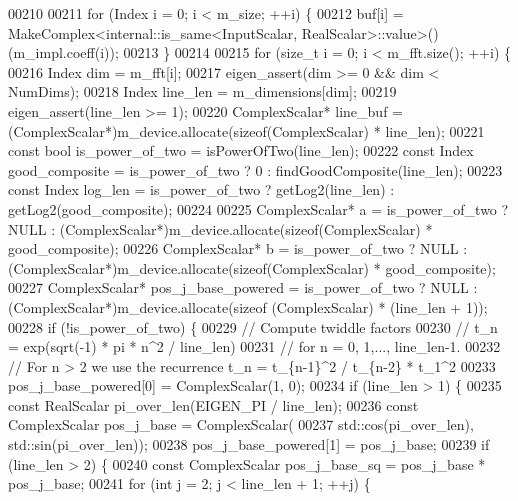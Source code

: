 \begin{DoxyCode}
00210 
00211     \textcolor{keywordflow}{for} (Index i = 0; i < m\_size; ++i) \{
00212       buf[i] = MakeComplex<internal::is\_same<InputScalar, RealScalar>::value>()(m\_impl.coeff(i));
00213     \}
00214 
00215     \textcolor{keywordflow}{for} (\textcolor{keywordtype}{size\_t} i = 0; i < m\_fft.size(); ++i) \{
00216       Index dim = m\_fft[i];
00217       eigen\_assert(dim >= 0 && dim < NumDims);
00218       Index line\_len = m\_dimensions[dim];
00219       eigen\_assert(line\_len >= 1);
00220       ComplexScalar* line\_buf = (ComplexScalar*)m\_device.allocate(\textcolor{keyword}{sizeof}(ComplexScalar) * line\_len);
00221       \textcolor{keyword}{const} \textcolor{keywordtype}{bool} is\_power\_of\_two = isPowerOfTwo(line\_len);
00222       \textcolor{keyword}{const} Index good\_composite = is\_power\_of\_two ? 0 : findGoodComposite(line\_len);
00223       \textcolor{keyword}{const} Index log\_len = is\_power\_of\_two ? getLog2(line\_len) : getLog2(good\_composite);
00224 
00225       ComplexScalar* a = is\_power\_of\_two ? NULL : (ComplexScalar*)m\_device.allocate(\textcolor{keyword}{sizeof}(ComplexScalar) *
       good\_composite);
00226       ComplexScalar* b = is\_power\_of\_two ? NULL : (ComplexScalar*)m\_device.allocate(\textcolor{keyword}{sizeof}(ComplexScalar) *
       good\_composite);
00227       ComplexScalar* pos\_j\_base\_powered = is\_power\_of\_two ? NULL : (ComplexScalar*)m\_device.allocate(\textcolor{keyword}{sizeof}
      (ComplexScalar) * (line\_len + 1));
00228       \textcolor{keywordflow}{if} (!is\_power\_of\_two) \{
00229         \textcolor{comment}{// Compute twiddle factors}
00230         \textcolor{comment}{//   t\_n = exp(sqrt(-1) * pi * n^2 / line\_len)}
00231         \textcolor{comment}{// for n = 0, 1,..., line\_len-1.}
00232         \textcolor{comment}{// For n > 2 we use the recurrence t\_n = t\_\{n-1\}^2 / t\_\{n-2\} * t\_1^2}
00233         pos\_j\_base\_powered[0] = ComplexScalar(1, 0);
00234         \textcolor{keywordflow}{if} (line\_len > 1) \{
00235           \textcolor{keyword}{const} RealScalar pi\_over\_len(EIGEN\_PI / line\_len);
00236           \textcolor{keyword}{const} ComplexScalar pos\_j\_base = ComplexScalar(
00237            std::cos(pi\_over\_len), std::sin(pi\_over\_len));
00238           pos\_j\_base\_powered[1] = pos\_j\_base;
00239           \textcolor{keywordflow}{if} (line\_len > 2) \{
00240             \textcolor{keyword}{const} ComplexScalar pos\_j\_base\_sq = pos\_j\_base * pos\_j\_base;
00241             \textcolor{keywordflow}{for} (\textcolor{keywordtype}{int} j = 2; j < line\_len + 1; ++j) \{

\end{DoxyCode}
